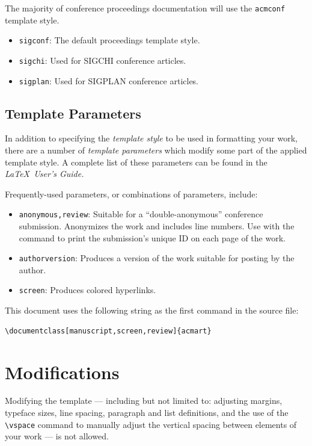\documentclass[manuscript,screen,review]{acmart}
\begin{document}
The majority of conference proceedings documentation will use the {\verb|acmconf|} template style.
\begin{itemize}
\item {\texttt{sigconf}}: The default proceedings template style.
\item{\texttt{sigchi}}: Used for SIGCHI conference articles.
\item{\texttt{sigplan}}: Used for SIGPLAN conference articles.
\end{itemize}

\subsection{Template Parameters}

In addition to specifying the {\itshape template style} to be used in
formatting your work, there are a number of {\itshape template parameters}
which modify some part of the applied template style. A complete list
of these parameters can be found in the {\itshape \LaTeX\ User's Guide.}

Frequently-used parameters, or combinations of parameters, include:
\begin{itemize}
\item {\texttt{anonymous,review}}: Suitable for a ``double-anonymous''
  conference submission. Anonymizes the work and includes line
  numbers. Use with the \texttt{\string\acmSubmissionID} command to print the
  submission's unique ID on each page of the work.
\item{\texttt{authorversion}}: Produces a version of the work suitable
  for posting by the author.
\item{\texttt{screen}}: Produces colored hyperlinks.
\end{itemize}

This document uses the following string as the first command in the
source file:
\begin{verbatim}
\documentclass[manuscript,screen,review]{acmart}
\end{verbatim}

\section{Modifications}

Modifying the template --- including but not limited to: adjusting
margins, typeface sizes, line spacing, paragraph and list definitions,
and the use of the \verb|\vspace| command to manually adjust the
vertical spacing between elements of your work --- is not allowed.
\end{document}
